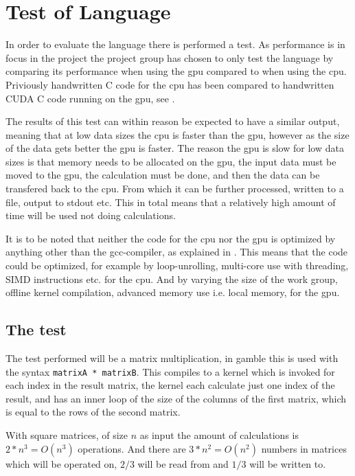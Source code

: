 \chapter{Test of Language}
\label{cha:test_of_language}
In order to evaluate the language there is performed a test. 
As performance is in focus in the project the project group has chosen to only test the language by comparing its performance when using the \gls{gpu} compared to when using the \gls{cpu}.
Priviously handwritten C code for the \gls{cpu} has been compared to handwritten CUDA C code running on the \gls{gpu}, see .

The results of this test can within reason be expected to have a similar output, meaning that at low data sizes the \gls{cpu} is faster than the \gls{gpu}, however as the size of the data gets better the \gls{gpu} is faster.
The reason the \gls{gpu} is slow for low data sizes is that memory needs to be allocated on the \gls{gpu}, the input data must be moved to the \gls{gpu}, the calculation must be done, and then the data can be transfered back to the \gls{cpu}. 
From which it can be further processed, written to a file, output to stdout etc. 
This in total means that a relatively high amount of time will be used not doing calculations. 

It is to be noted that neither the code for the \gls{cpu} nor the \gls{gpu} is optimized by anything other than the gcc-compiler, as explained in . 
This means that the code could be optimized, for example by loop-unrolling, multi-core use with threading, SIMD instructions etc. for the \gls{cpu}. 
And by varying the size of the work group, offline kernel compilation, advanced memory use i.e. local memory, for the \gls{gpu}.  

\section{The test}
The test performed will be a matrix multiplication, in gamble this is used with the syntax \texttt{matrixA * matrixB}. 
This compiles to a kernel which is invoked for each index in the result matrix, the kernel each calculate just one index of the result, and has an inner loop of the size of the columns of the first matrix, which is equal to the rows of the second matrix. 

With square matrices, of size $n$ as input the amount of calculations is $2*n^3 = O(n^3)$ operations. 
And there are $3*n^2 = O(n^2)$ numbers in matrices which will be operated on, $2/3$ will be read from and $1/3$ will be written to. 